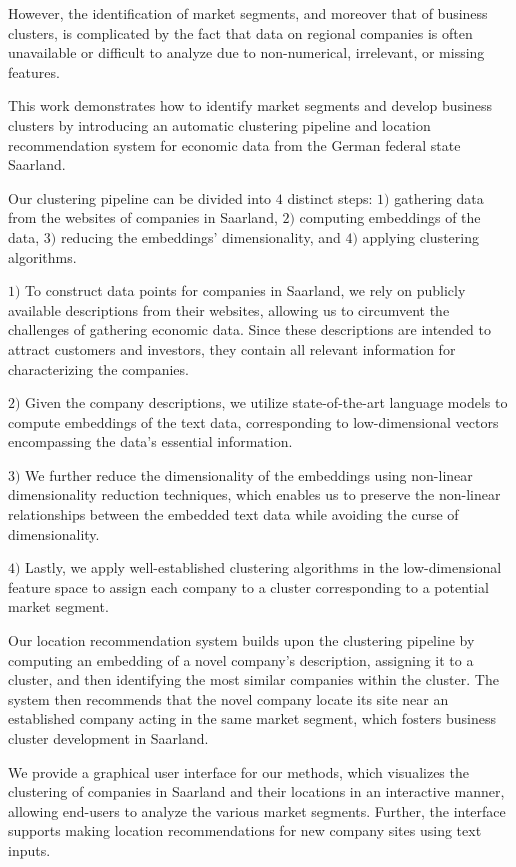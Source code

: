 \documentclass[conference]{IEEEtran}
\begin{document}
However, the identification of market segments, and moreover that of business clusters, is complicated by the fact that data on regional companies is often unavailable or difficult to analyze due to non-numerical, irrelevant, or missing features.

This work demonstrates how to identify market segments and develop business clusters by introducing an automatic clustering pipeline and location recommendation system for economic data from the German federal state Saarland.

Our clustering pipeline can be divided into $4$ distinct steps: $1)$ gathering data from the websites of companies in Saarland, $2)$ computing embeddings of the data, $3)$ reducing the embeddings' dimensionality, and $4)$ applying clustering algorithms.

$1)$ To construct data points for companies in Saarland, we rely on publicly available descriptions from their websites, allowing us to circumvent the challenges of gathering economic data. Since these descriptions are intended to attract customers and investors, they contain all relevant information for characterizing the companies.

$2)$ Given the company descriptions, we utilize state-of-the-art language models to compute embeddings of the text data, corresponding to low-dimensional vectors encompassing the data's essential information. 

$3)$ We further reduce the dimensionality of the embeddings using non-linear dimensionality reduction techniques, which enables us to preserve the non-linear relationships between the embedded text data while avoiding the curse of dimensionality. 

$4)$ Lastly, we apply well-established clustering algorithms in the low-dimensional feature space to assign each company to a cluster corresponding to a potential market segment.

Our location recommendation system builds upon the clustering pipeline by computing an embedding of a novel company's description, assigning it to a cluster, and then identifying the most similar companies within the cluster. The system then recommends that the novel company locate its site near an established company acting in the same market segment, which fosters business cluster development in Saarland.

We provide a graphical user interface for our methods, which visualizes the clustering of companies in Saarland and their locations in an interactive manner, allowing end-users to analyze the various market segments. Further, the interface supports making location recommendations for new company sites using text inputs.
\end{document}
